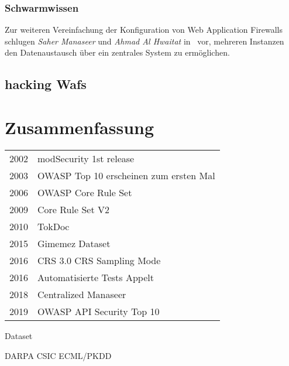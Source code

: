 \subsubsection{Schwarmwissen}
Zur weiteren Vereinfachung der Konfiguration von Web Application Firewalls schlugen \emph{Saher Manaseer} und \emph{Ahmad Al Hwaitat} in~\cite{Manaseer2018} vor, mehreren Instanzen den Datenaustausch über ein zentrales System zu ermöglichen. 




\subsection{hacking Wafs}


\section{Zusammenfassung}


\begin{tabular}{ll}
  2002 & modSecurity 1st release \\
  2003 & OWASP Top 10 erscheinen zum ersten Mal\\
  2006 & OWASP Core Rule Set \\
  2009 & Core Rule Set V2 \\
  2010 & TokDoc \\
  2015 & Gimemez Dataset \\
  2016 & CRS 3.0 CRS Sampling Mode \\
  2016 & Automatisierte Tests Appelt \\
  2018 & Centralized Manaseer\\
  2019 & OWASP API Security Top 10\\
\end{tabular}

Dataset

DARPA
CSIC
ECML/PKDD

